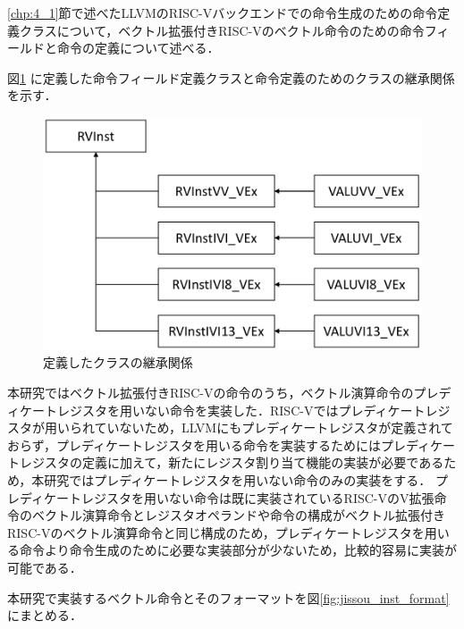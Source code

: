 
\ref{chp:4_1}節で述べたLLVMのRISC-Vバックエンドでの命令生成のための命令定義クラスについて，ベクトル拡張付きRISC-Vのベクトル命令のための命令フィールドと命令の定義について述べる．

図\ref{fig:MIQSInst_class}
に定義した命令フィールド定義クラスと命令定義のためのクラスの継承関係を示す．

\begin{figure}[tb]
    \centering
    \includegraphics[scale=0.6]{image/MIQSInst_class.pdf}
    \caption{定義したクラスの継承関係}
    \label{fig:MIQSInst_class}
\end{figure}

本研究ではベクトル拡張付きRISC-Vの命令のうち，ベクトル演算命令のプレディケートレジスタを用いない命令を実装した．RISC-Vではプレディケートレジスタが用いられていないため，LLVMにもプレディケートレジスタが定義されておらず，プレディケートレジスタを用いる命令を実装するためにはプレディケートレジスタの定義に加えて，新たにレジスタ割り当て機能の実装が必要であるため，本研究ではプレディケートレジスタを用いない命令のみの実装をする．
プレディケートレジスタを用いない命令は既に実装されているRISC-VのV拡張命令のベクトル演算命令とレジスタオペランドや命令の構成がベクトル拡張付きRISC-Vのベクトル演算命令と同じ構成のため，プレディケートレジスタを用いる命令より命令生成のために必要な実装部分が少ないため，比較的容易に実装が可能である．

本研究で実装するベクトル命令とそのフォーマットを図\ref{fig:jissou_inst_format}
にまとめる．

